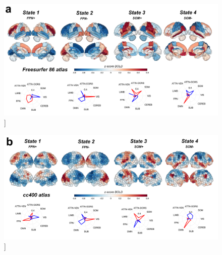 \documentclass[phd,tocprelim]{cornell}
\renewcommand{\caption}[1]{\singlespacing\hangcaption{#1}\normalspacing}
\begin{document}
\null
\vfill
\begin{figure}[h!]
		\ContinuedFloat
		\captionsetup{labelformat=adja-page}
    \centering
    \includegraphics[width=1\textwidth]{chapter2/SupplementaryFig7a.png}
    \caption[]{}
\end{figure}
\null
\vfill
\clearpage
\null
\vfill
\begin{figure}[h!]
		\ContinuedFloat
		\captionsetup{labelformat=adja-page}
    \centering
    \includegraphics[width=\textwidth]{chapter2/SupplementaryFig7b.png}
    \caption[]{}
\end{figure}
\null
\vfill
\clearpage
\null
\vfill
\end{document}
